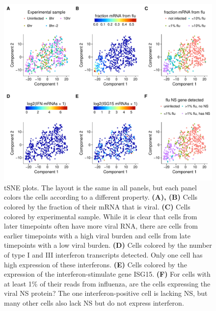 \documentclass[9pt,lineno]{elife}
\begin{document}
\begin{figure}
\centerline{\includegraphics[width=0.9\linewidth]{figures/p_small_tsne_merge.pdf}}
\caption{\label{fig:tsne}
tSNE plots.
The layout is the same in all panels, but each panel colors the cells according to a different property.
{\bf (A), (B)}
Cells colored by the fraction of their mRNA that is viral.
{\bf (C)}
Cells colored by experimental sample.
While it is clear that cells from later timepoints often have more viral RNA, there are cells from earlier timepoints with a high viral burden and cells from late timepoints with a low viral burden.
{\bf (D)}
Cells colored by the number of type I and III interferon transcripts detected.
Only one cell has high expression of these interferons.
{\bf (E)}
Cells colored by the expression of the interferon-stimulate gene ISG15.
{\bf (F)}
For cells with at least 1\% of their reads from influenza, are the cells expressing the viral NS protein?
The one interferon-positive cell is lacking NS, but many other cells also lack NS but do not express interferon.
}
\end{figure}
\end{document}

